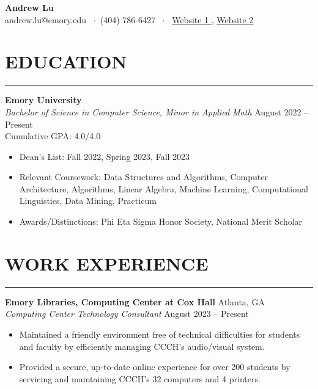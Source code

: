 \documentclass[10.5pt]{article}
\begin{document}
\noindent
\begin{center}
{\Large \textbf{\fontsize{14pt}{14pt}\selectfont Andrew Lu}} \\
andrew.lu@emory.edu \faEnvelope~$\cdot$~(404) 786-6427 \faPhone~$\cdot$~
\href{https://andrewtlu.github.io}{Website 1 \faInfo }, \href{https://www.boredbutton.com}{Website 2 \faInfo }
\end{center}

\section*{\large\textbf{EDUCATION}}
\vspace{-\baselineskip}
\noindent\rule{\textwidth}{0.4pt}

\noindent
\textbf{Emory University} \\
\emph{Bachelor of Science in Computer Science, Minor in Applied Math} \hfill August 2022 -- Present \\ 
Cumulative GPA: 4.0/4.0 
\begin{itemize}
\item Dean's List: Fall 2022, Spring 2023, Fall 2023
\item Relevant Coursework: Data Structures and Algorithms, Computer Architecture, Algorithms, Linear Algebra, Machine Learning, Computational Linguistics, Data Mining, Practicum
\item Awards/Distinctions: Phi Eta Sigma Honor Society, National Merit Scholar
\end{itemize}
 \vspace{-\baselineskip}
\section*{\large\textbf{WORK EXPERIENCE}} 
 \vspace{-\baselineskip} 
\noindent\rule{\textwidth}{0.4pt} 


\noindent
\textbf{Emory Libraries, Computing Center at Cox Hall} \hfill {Atlanta, GA}\\
\emph{Computing Center Technology Consultant} \hfill {August 2023} -- {Present}
\begin{itemize}
    \item Maintained a friendly environment free of technical difficulties for students and faculty by efficiently managing CCCH's audio/visual system. \item Provided a secure, up-to-date online experience for over 200 students by servicing and maintaining CCCH's 32 computers and 4 printers.
\end{itemize}
\end{document}
